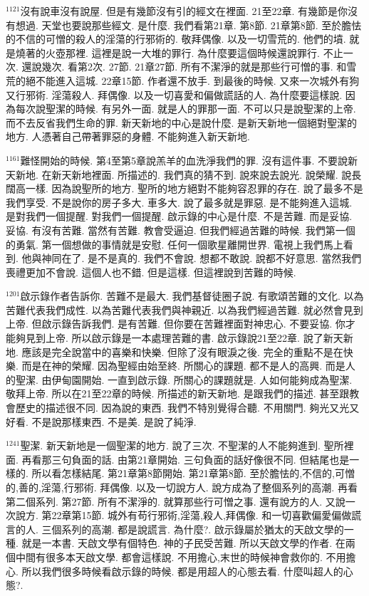 \documentclass{book}
\begin{document}
$^{1121}$沒有說車沒有說屋.
但是有幾節沒有引的經文在裡面.
21至22章.
有幾節是你沒有想過.
天堂也要說那些經文.
是什麼.
我們看第21章.
第8節.
21章第8節.
至於膽怯的不信的可憎的殺人的淫蕩的行邪術的.
敬拜偶像.
以及一切雪荒的.
他們的墳.
就是燒著的火壺那裡.
這裡是說一大堆的罪行.
為什麼要這個時候還說罪行.
不止一次.
還說幾次.
看第2次.
27節.
21章27節.
所有不潔淨的就是那些行可憎的事.
和雪荒的絕不能進入這城.
22章15節.
作者還不放手.
到最後的時候.
又來一次城外有狗又行邪術.
淫蕩殺人.
拜偶像.
以及一切喜愛和偏做謊話的人.
為什麼要這樣說.
因為每次說聖潔的時候.
有另外一面.
就是人的罪那一面.
不可以只是說聖潔的上帝.
而不去反省我們生命的罪.
新天新地的中心是說什麼.
是新天新地一個絕對聖潔的地方.
人憑著自己帶著罪惡的身體.
不能夠進入新天新地.

$^{1161}$難怪開始的時候.
第4至第5章說羔羊的血洗淨我們的罪.
沒有這件事.
不要說新天新地.
在新天新地裡面.
所描述的.
我們真的猜不到.
說來說去說光.
說榮耀.
說長闊高一樣.
因為說聖所的地方.
聖所的地方絕對不能夠容忍罪的存在.
說了最多不是我們享受.
不是說你的房子多大.
車多大.
說了最多就是罪惡.
是不能夠進入這城.
是對我們一個提醒.
對我們一個提醒.
啟示錄的中心是什麼.
不是苦難.
而是妥協.
妥協.
有沒有苦難.
當然有苦難.
教會受逼迫.
但我們經過苦難的時候.
我們第一個的勇氣.
第一個想做的事情就是安慰.
任何一個歌星離開世界.
電視上我們馬上看到.
他與神同在了.
是不是真的.
我們不會說.
想都不敢說.
說都不好意思.
當然我們喪禮更加不會說.
這個人也不錯.
但是這樣.
但這裡說到苦難的時候.

$^{1201}$啟示錄作者告訴你.
苦難不是最大.
我們基督徒圈子說.
有歌頌苦難的文化.
以為苦難代表我們成性.
以為苦難代表我們與神親近.
以為我們經過苦難.
就必然會見到上帝.
但啟示錄告訴我們.
是有苦難.
但你要在苦難裡面對神忠心.
不要妥協.
你才能夠見到上帝.
所以啟示錄是一本處理苦難的書.
啟示錄說21至22章.
說了新天新地.
應該是完全說當中的喜樂和快樂.
但除了沒有眼淚之後.
完全的重點不是在快樂.
而是在神的榮耀.
因為聖經由始至終.
所關心的課題.
都不是人的高興.
而是人的聖潔.
由伊甸園開始.
一直到啟示錄.
所關心的課題就是.
人如何能夠成為聖潔.
敬拜上帝.
所以在21至22章的時候.
所描述的新天新地.
是跟我們的描述.
甚至跟教會歷史的描述很不同.
因為說的東西.
我們不特別覺得合聽.
不用關門.
夠光又光又好看.
不是說那樣東西.
不是美.
是說了純淨.

$^{1241}$聖潔.
新天新地是一個聖潔的地方.
說了三次.
不聖潔的人不能夠進到.
聖所裡面.
再看那三句負面的話.
由第21章開始.
三句負面的話好像很不同.
但結尾也是一樣的.
所以看怎樣結尾.
第21章第8節開始.
第21章第8節.
至於膽怯的,不信的,可憎的,善的,淫蕩,行邪術.
拜偶像.
以及一切說方人.
說方成為了整個系列的高潮.
再看第二個系列.
第27節.
所有不潔淨的.
就算那些行可憎之事.
還有說方的人.
又說一次說方.
第22章第15節.
城外有苟行邪術,淫蕩,殺人,拜偶像.
和一切喜歡偏愛偏做謊言的人.
三個系列的高潮.
都是說謊言.
為什麼?.
啟示錄屬於猶太的天啟文學的一種.
就是一本書.
天啟文學有個特色.
神的子民受苦難.
所以天啟文學的作者.
在兩個中間有很多本天啟文學.
都會這樣說.
不用擔心,末世的時候神會救你的.
不用擔心.
所以我們很多時候看啟示錄的時候.
都是用超人的心態去看.
什麼叫超人的心態?.
\end{document}
